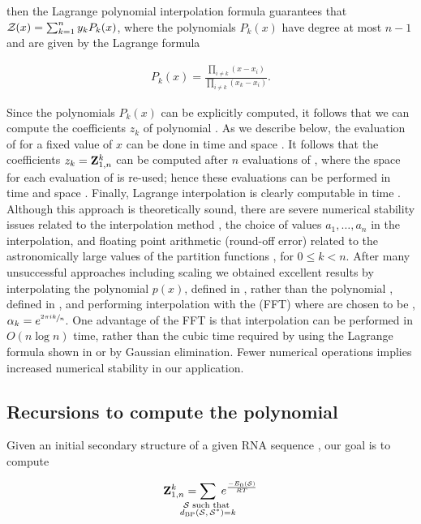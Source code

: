 then the Lagrange polynomial interpolation formula guarantees that
${\mathcal Z}_{}(x) = \sum_{k=1}^n y_k P_k(x)$, where the polynomials $P_k(x)$ have degree
at most $n-1$ and are given by the Lagrange formula

\begin{align}
\label{eq:fftbor:lagrangeInterpolation}
P_k(x) = \frac{\prod_{i\ne k} (x-x_i)}{\prod_{i \ne k} (x_k-x_i)}.
\end{align}

Since the polynomials $P_k(x)$ can be explicitly computed, it follows that
we can compute the coefficients $z_k$ of polynomial \fullZx. As we describe
below, the evaluation of \fullZx for a fixed value of $x$ can be done in
time  and space .  It follows that the coefficients
$z_k={\bf Z}^{k}_{1,n}$ can be computed after
$n$ evaluations of \fullZx, where the space for each evaluation of \fullZx
is re-used; hence these evaluations can be performed in time  and space
. Finally,
Lagrange interpolation is clearly computable in time .
Although this approach is theoretically sound, there are severe
numerical stability issues related to the interpolation method
\citep{highambarycentricinterpolation},
the choice of values $a_1,\dots,a_{n}$ in the interpolation,
and floating point arithmetic (round-off error) related to the
astronomically large values of the partition functions
, for $0 \leq k < n$. After many unsuccessful
approaches including scaling we obtained excellent results by
interpolating the polynomial $p(x)$, defined in ,
rather than the polynomial \fullZx, defined in ,
and performing interpolation with the \fft (FFT) \citep{cormen}
where \alphaN are
chosen to be \nRoUs,
$\alpha_k = e^{\sfrac{2 \pi i k}{n}}$.
One
advantage of the FFT is that interpolation can be performed in $O(n \log n)$
time, rather than the cubic time required by using the Lagrange formula
shown in  or by Gaussian elimination. Fewer
numerical operations implies increased numerical stability in our application.

\subsection{Recursions to compute the polynomial
\texorpdfstring{}{}}
\label{subsec:fftbor:polynomial}

Given an initial secondary structure \strSt of a
given RNA sequence \seq, our goal is to compute

\begin{align}
\label{eq:fftbor:defZofK}
\bfZ{k}{1,n} = \sum_{\mathclap{\substack{\str \text{ such that }\\ \dBP{\str}{\strSt}=k}}}\;
\boltzNuss{\str}
\end{align}

